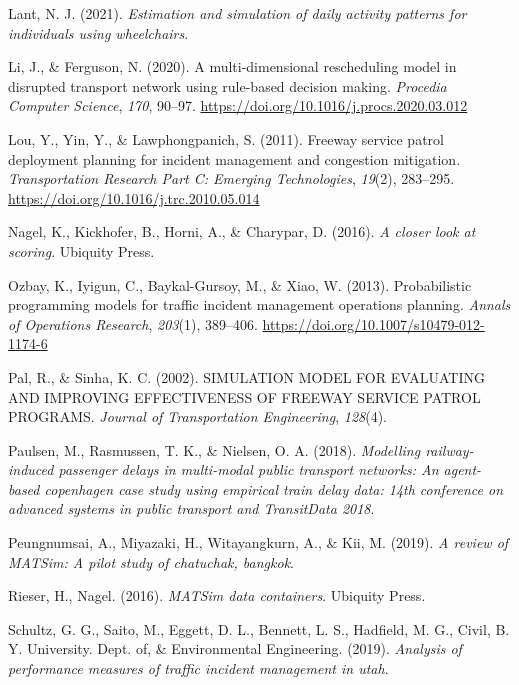 \documentclass[fancy, oneside, mastersfancy, ms]{byuthesis}
\newlength{\cslhangindent}
\newlength{\cslentryspacingunit} %
\newenvironment{CSLReferences}[2] %
 {%
  \setlength{\parindent}{0pt}
  \ifodd #1
  \let\oldpar\par
  \def\par{\hangindent=\cslhangindent\oldpar}
  \fi
  \setlength{\parskip}{#2\cslentryspacingunit}
 }%
 {}
\begin{document}
\begin{CSLReferences}{1}{0}
\leavevmode{}%
Lant, N. J. (2021). \emph{Estimation and simulation of daily activity
patterns for individuals using wheelchairs}.

\leavevmode{}%
Li, J., \& Ferguson, N. (2020). A multi-dimensional rescheduling model
in disrupted transport network using rule-based decision making.
\emph{Procedia Computer Science}, \emph{170}, 90--97.
\url{https://doi.org/10.1016/j.procs.2020.03.012}

\leavevmode{}%
Lou, Y., Yin, Y., \& Lawphongpanich, S. (2011). Freeway service patrol
deployment planning for incident management and congestion mitigation.
\emph{Transportation Research Part C: Emerging Technologies},
\emph{19}(2), 283--295. \url{https://doi.org/10.1016/j.trc.2010.05.014}

\leavevmode{}%
Nagel, K., Kickhofer, B., Horni, A., \& Charypar, D. (2016). \emph{A
closer look at scoring}. {Ubiquity Press}.

\leavevmode{}%
Ozbay, K., Iyigun, C., Baykal-Gursoy, M., \& Xiao, W. (2013).
Probabilistic programming models for traffic incident management
operations planning. \emph{Annals of Operations Research},
\emph{203}(1), 389--406. \url{https://doi.org/10.1007/s10479-012-1174-6}

\leavevmode{}%
Pal, R., \& Sinha, K. C. (2002). {SIMULATION MODEL FOR EVALUATING AND
IMPROVING EFFECTIVENESS OF FREEWAY SERVICE PATROL PROGRAMS}.
\emph{Journal of Transportation Engineering}, \emph{128}(4).

\leavevmode{}%
Paulsen, M., Rasmussen, T. K., \& Nielsen, O. A. (2018). \emph{Modelling
railway-induced passenger delays in multi-modal public transport
networks: {An} agent-based copenhagen case study using empirical train
delay data: 14th conference on advanced systems in public transport and
{TransitData} 2018}.

\leavevmode{}%
Peungnumsai, A., Miyazaki, H., Witayangkurn, A., \& Kii, M. (2019).
\emph{A review of {MATSim}: {A} pilot study of chatuchak, bangkok}.

\leavevmode{}%
Rieser, H., Nagel. (2016). \emph{MATSim data containers}. {Ubiquity
Press}.

\leavevmode{}%
Schultz, G. G., Saito, M., Eggett, D. L., Bennett, L. S., Hadfield, M.
G., Civil, B. Y. University. Dept. of, \& Environmental Engineering.
(2019). \emph{Analysis of performance measures of traffic incident
management in utah}.


\end{CSLReferences}
\end{document}
